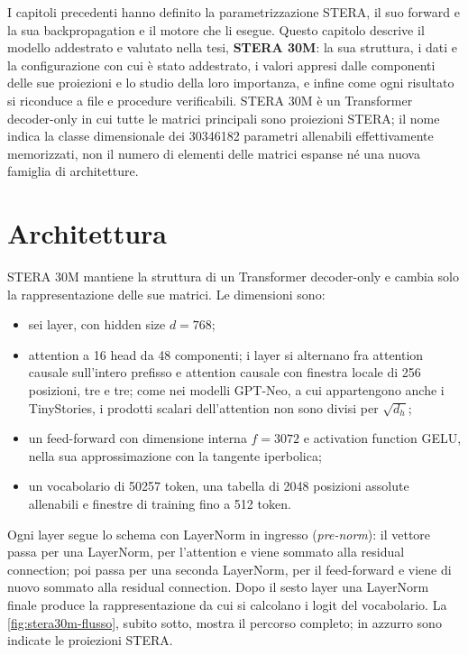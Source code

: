 I capitoli precedenti hanno definito la parametrizzazione STERA, il suo forward e la sua backpropagation e il motore che li esegue. Questo capitolo descrive il modello addestrato e valutato nella tesi, \textbf{STERA 30M}: la sua struttura, i dati e la configurazione con cui è stato addestrato, i valori appresi dalle componenti delle sue proiezioni e lo studio della loro importanza, e infine come ogni risultato si riconduce a file e procedure verificabili. STERA 30M è un Transformer decoder-only in cui tutte le matrici principali sono proiezioni STERA; il nome indica la classe dimensionale dei \num{30346182} parametri allenabili effettivamente memorizzati, non il numero di elementi delle matrici espanse né una nuova famiglia di architetture.

\section{Architettura}
\label{sec:architettura-stera30m}

STERA 30M mantiene la struttura di un Transformer decoder-only e cambia solo la rappresentazione delle sue matrici. Le dimensioni sono:
\begin{itemize}
\item sei layer, con hidden size $d=768$;
\item attention a 16 head da 48 componenti; i layer si alternano fra attention causale sull'intero prefisso e attention causale con finestra locale di 256 posizioni, tre e tre; come nei modelli GPT-Neo, a cui appartengono anche i TinyStories, i prodotti scalari dell'attention non sono divisi per $\sqrt{d_h}$;
\item un feed-forward con dimensione interna $f=\num{3072}$ e activation function GELU, nella sua approssimazione con la tangente iperbolica;
\item un vocabolario di \num{50257} token, una tabella di \num{2048} posizioni assolute allenabili e finestre di training fino a 512 token.
\end{itemize}

Ogni layer segue lo schema con LayerNorm in ingresso (\emph{pre-norm}): il vettore passa per una LayerNorm, per l'attention e viene sommato alla residual connection; poi passa per una seconda LayerNorm, per il feed-forward e viene di nuovo sommato alla residual connection. Dopo il sesto layer una LayerNorm finale produce la rappresentazione da cui si calcolano i logit del vocabolario. La \autoref{fig:stera30m-flusso}, subito sotto, mostra il percorso completo; in azzurro sono indicate le proiezioni STERA.

